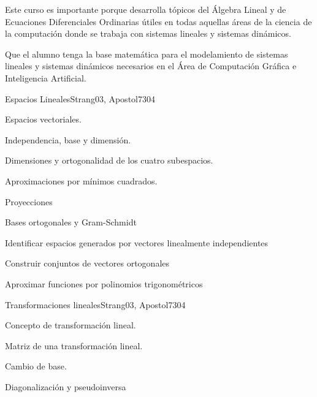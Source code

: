 \begin{syllabus}


\begin{justification}
Este curso es importante porque desarrolla tópicos del Álgebra Lineal y de Ecuaciones Diferenciales Ordinarias útiles en todas aquellas áreas de la ciencia de la computación donde se trabaja con sistemas lineales y sistemas dinámicos.
\end{justification}

\begin{goals}
\item Que el alumno tenga la base matemática para el modelamiento de sistemas lineales y sistemas dinámicos necesarios en el Área de Computación Gráfica e Inteligencia Artificial.
\end{goals}

\begin{outcomes}
\end{outcomes}

\begin{unit}{Espacios Lineales}{}{Strang03, Apostol73}{0}{4}
\begin{topics}
      \item Espacios vectoriales.
      \item Independencia, base y dimensión.
      \item Dimensiones y ortogonalidad de los cuatro subespacios.
      \item Aproximaciones por mínimos cuadrados.
      \item Proyecciones
      \item Bases ortogonales y Gram-Schmidt
   \end{topics}

   \begin{learningoutcomes}
      \item Identificar espacios generados por vectores linealmente independientes
      \item Construir conjuntos de vectores ortogonales
      \item Aproximar funciones por polinomios trigonométricos
   \end{learningoutcomes}
\end{unit}

\begin{unit}{Transformaciones lineales}{}{Strang03, Apostol73}{0}{4}
\begin{topics}
      \item Concepto de transformación lineal.
      \item Matriz de una transformación lineal.
      \item Cambio de base.
      \item Diagonalización y pseudoinversa
   \end{topics}


\end{unit}
\end{syllabus}
